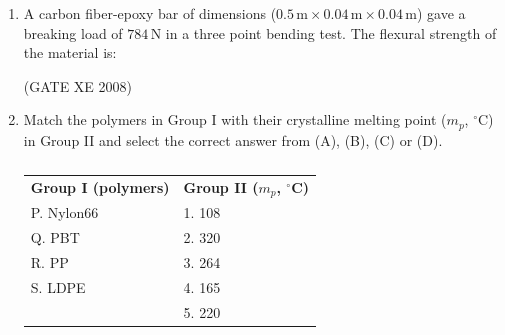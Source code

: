 \documentclass[12pt]{article}
\begin{document}
\begin{enumerate}
\begin{enumerate}
\end{enumerate}

(GATE XE 2008)

\item A carbon fiber-epoxy bar of dimensions ($0.5\,\mathrm{m} \times 0.04\,\mathrm{m} \times 0.04\,\mathrm{m}$) gave a breaking load of $784\,\mathrm{N}$ in a three point bending test. The flexural strength of the material is:

\begin{enumerate}
\end{enumerate}

(GATE XE 2008)

\item Match the polymers in Group I with their crystalline melting point ($m_p$, $^\circ$C) in Group II and select the correct answer from (A), (B), (C) or (D).

\begin{table}[H]     \centering     \caption{}     \label{}     \begin{tabular}{l l}
\textbf{Group I (polymers)} & \textbf{Group II ($m_p$, $^\circ$C)} \\
P. Nylon66 & 1. 108 \\
Q. PBT & 2. 320 \\
R. PP & 3. 264 \\
S. LDPE & 4. 165 \\
& 5. 220 \\
\end{tabular} \end{table}

\begin{enumerate}
\end{enumerate}


\end{enumerate}
\end{document}
